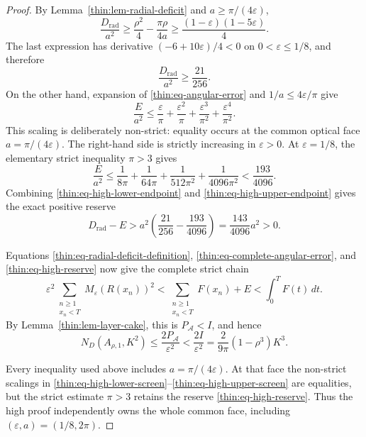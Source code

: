\documentclass[11pt]{article}
\numberwithin{equation}{section}
\theoremstyle{definition}
\theoremstyle{remark}
\begin{document}
\begin{proof}
By Lemma~\ref{thin:lem-radial-deficit} and
\(a\geq\pi/(4\varepsilon)\),
\begin{equation}
  \frac{D_{\mathrm{rad}}}{a^2}
  \geq\frac{\rho^2}{4}-\frac{\pi\rho}{4a}
  \geq\frac{(1-\varepsilon)(1-5\varepsilon)}4.
  \label{thin:eq-high-lower-screen}
\end{equation}
The last expression has derivative
\((-6+10\varepsilon)/4<0\) on \(0<\varepsilon\leq1/8\), and therefore
\begin{equation}
  \frac{D_{\mathrm{rad}}}{a^2}\geq\frac{21}{256}.
  \label{thin:eq-high-lower-endpoint}
\end{equation}
On the other hand, expansion of \eqref{thin:eq-angular-error} and
\(1/a\leq4\varepsilon/\pi\) give
\begin{equation}
  \frac{E}{a^2}
  \leq\frac\varepsilon\pi+\frac{\varepsilon^2}\pi
     +\frac{\varepsilon^3}{\pi^2}
     +\frac{\varepsilon^4}{\pi^2}.
  \label{thin:eq-high-upper-screen}
\end{equation}
This scaling is deliberately non-strict: equality occurs at the common
optical face \(a=\pi/(4\varepsilon)\).  The right-hand side is strictly
increasing in \(\varepsilon>0\).  At \(\varepsilon=1/8\), the elementary
strict inequality \(\pi>3\) gives
\begin{equation}
  \frac{E}{a^2}
  \leq\frac1{8\pi}+\frac1{64\pi}
      +\frac1{512\pi^2}+\frac1{4096\pi^2}
  <\frac{193}{4096}.
  \label{thin:eq-high-upper-endpoint}
\end{equation}
Combining \eqref{thin:eq-high-lower-endpoint} and
\eqref{thin:eq-high-upper-endpoint} gives the exact positive reserve
\begin{equation}
  D_{\mathrm{rad}}-E
  >a^2\left(\frac{21}{256}-\frac{193}{4096}\right)
  =\frac{143}{4096}a^2>0.
  \label{thin:eq-high-reserve}
\end{equation}

Equations \eqref{thin:eq-radial-deficit-definition},
\eqref{thin:eq-complete-angular-error}, and
\eqref{thin:eq-high-reserve} now give the complete strict chain
\begin{equation}
  \varepsilon^2
  \sum_{\substack{n\geq1\\x_n<T}}
    M_\varepsilon(R(x_n))^2
  <\sum_{\substack{n\geq1\\x_n<T}}F(x_n)+E
  <\int_0^T F(t)\,dt.
  \label{thin:eq-high-strict-chain}
\end{equation}
By Lemma~\ref{thin:lem-layer-cake}, this is \(P_{\mathcal A}<I\), and hence
\[
  N_D(A_{\rho,1},K^2)
  \leq\frac{2P_{\mathcal A}}{\varepsilon^2}
  <\frac{2I}{\varepsilon^2}
  =\frac{2}{9\pi}(1-\rho^3)K^3.
\]

Every inequality used above includes \(a=\pi/(4\varepsilon)\).  At that
face the non-strict scalings in
\eqref{thin:eq-high-lower-screen}--\eqref{thin:eq-high-upper-screen} are
equalities, but the strict estimate \(\pi>3\) retains the reserve
\eqref{thin:eq-high-reserve}.  Thus the high proof independently owns the
whole common face, including \((\varepsilon,a)=(1/8,2\pi)\).
\end{proof}
\end{document}
